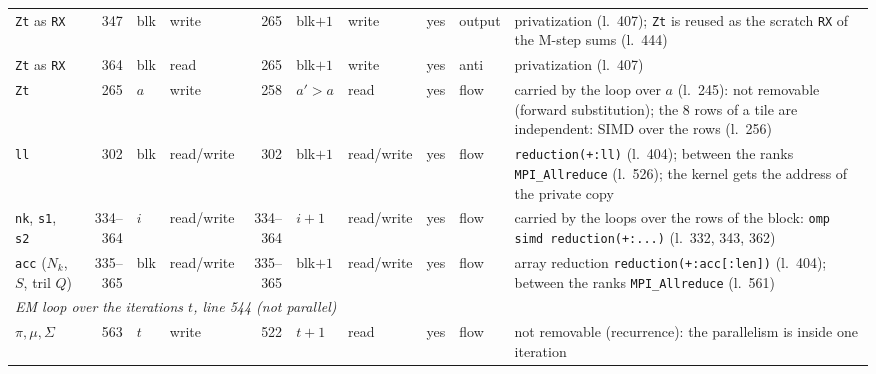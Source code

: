 \documentclass[conference,onecolumn]{IEEEtran}
\begin{document}
\begin{table}[H]
\begin{tabular}{lrllrllllp{}}
\texttt{Zt} as \texttt{RX} & 347 & blk & write & 265 & blk$+1$ & write & yes & output & privatization (l.~407); \texttt{Zt} is reused as the scratch \texttt{RX} of the M-step sums (l.~444) \\
\texttt{Zt} as \texttt{RX} & 364 & blk & read & 265 & blk$+1$ & write & yes & anti & privatization (l.~407) \\
\texttt{Zt} & 265 & $a$ & write & 258 & $a'>a$ & read & yes & flow & carried by the loop over $a$ (l.~245): not removable (forward substitution); the 8 rows of a tile are independent: SIMD over the rows (l.~256) \\
\texttt{ll} & 302 & blk & read/write & 302 & blk$+1$ & read/write & yes & flow & \texttt{reduction(+:ll)} (l.~404); between the ranks \texttt{MPI\_Allreduce} (l.~526); the kernel gets the address of the private copy \\
\texttt{nk}, \texttt{s1}, \texttt{s2} & 334--364 & $i$ & read/write & 334--364 & $i+1$ & read/write & yes & flow & carried by the loops over the rows of the block: \texttt{omp simd reduction(+:...)} (l.~332, 343, 362) \\
\texttt{acc} ($N_k$, $S$, tril $Q$) & 335--365 & blk & read/write & 335--365 & blk$+1$ & read/write & yes & flow & array reduction \texttt{reduction(+:acc[:len])} (l.~404); between the ranks \texttt{MPI\_Allreduce} (l.~561) \\
\midrule
\multicolumn{10}{p{0.92\textwidth}}{\emph{EM loop over the iterations $t$, line 544 (not parallel)}} \\
$\pi,\mu,\Sigma$ & 563 & $t$ & write & 522 & $t+1$ & read & yes & flow & not removable (recurrence): the parallelism is inside one iteration \\
\bottomrule
\end{tabular}
\end{table}
\end{document}
